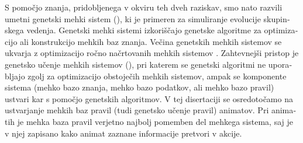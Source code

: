 \begin{slovenian}
S pomočjo znanja, pridobljenega v okviru teh dveh raziskav, smo nato razvili umetni genetski mehki sistem (), ki je primeren za simuliranje evolucije skupinskega vedenja. Genetski mehki sistemi \cite{cordon2001genetic,cordon2004ten,fernandez2015revisiting,herrera1996genetic,herrera2008genetic,pedrycz1996fuzzy,sanchez1997genetic} izkoriščajo genetske algoritme za optimizacijo ali konstrukcijo mehkih baz znanja. Večina genetskih mehkih sistemov se ukvarja z optimizacijo ročno načrtovanih mehkih sistemov \cite{cordon2004ten,fernandez2015revisiting,herrera2008genetic}. Zahtevnejši pristop je genetsko učenje mehkih sistemov (), pri katerem se genetski algoritmi ne uporabljajo zgolj za optimizacijo obstoječih mehkih sistemov, ampak se komponente sistema (mehko bazo znanja, mehko bazo podatkov, ali mehko bazo pravil) ustvari kar s pomočjo genetskih algoritmov. V tej disertaciji se osredotočamo na ustvarjanje mehkih baz pravil (tudi genetsko učenje pravil) animatov. Pri animatih je mehka baza pravil verjetno najbolj pomemben del mehkega sistema, saj je v njej zapisano kako animat zaznane informacije pretvori v akcije.


\end{slovenian}
